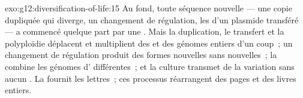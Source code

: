 \begin{solution}{exo:g12:diversification-of-life:15}
Au fond, toute séquence nouvelle --- une copie dupliquée qui diverge,
un changement de régulation, les  d'un plasmide transféré --- a
commencé quelque part par une . Mais la duplication, le
transfert et la polyploïdie déplacent et multiplient des  et des
génomes entiers d'un coup~; un changement de régulation produit des
formes nouvelles sans  nouvelles~; la  combine les
génomes d' différentes~; et la culture transmet de la variation
sans aucun . La  fournit les lettres~; ces processus
réarrangent des pages et des livres entiers.
\end{solution}

